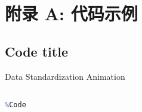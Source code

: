 \newpage
\section{附录 A: 代码示例}
\label{app:code}

\subsection{Code title}
\label{sec:label of code}

\begin{breakablealgorithm}
\caption{Data Standardization Animation}
\begin{algorithmic}[1]
\State %
\end{algorithmic}

\begin{lstlisting}[language=Mathematica, caption=Mathematica Code]

%Code

\end{lstlisting}
\end{breakablealgorithm}


